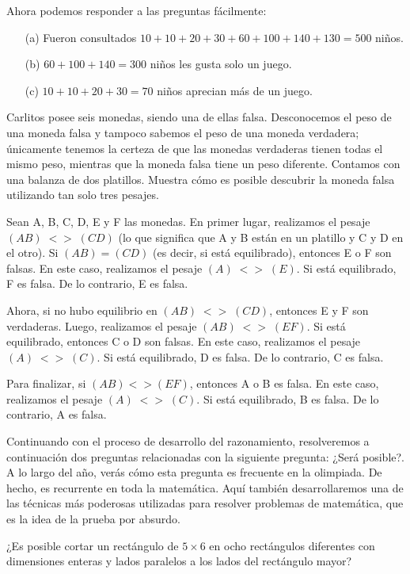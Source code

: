 \documentclass[11pt]{scrartcl}
\begin{document}
Ahora podemos responder a las preguntas fácilmente:
\begin{enumerate}
    \item[(a)] Fueron consultados \(10 + 10 + 20 + 30 + 60 + 100 + 140 + 130 = 500\) niños.
    \item[(b)] \(60 + 100 + 140 = 300\) niños les gusta solo un juego.
    \item[(c)] \(10 + 10 + 20 + 30 = 70\) niños aprecian más de un juego.
\end{enumerate}

\begin{example}
Carlitos posee seis monedas, siendo una de ellas falsa. Desconocemos el peso de una moneda falsa y tampoco sabemos el peso de una moneda verdadera; únicamente tenemos la certeza de que las monedas verdaderas tienen todas el mismo peso, mientras que la moneda falsa tiene un peso diferente. Contamos con una balanza de dos platillos. Muestra cómo es posible descubrir la moneda falsa utilizando tan solo tres pesajes.
\end{example}

Sean A, B, C, D, E y F las monedas. En primer lugar, realizamos el pesaje
\( (AB) \; <> \; (CD) \) (lo que significa que A y B están en un platillo y C y D en el otro). Si \( (AB) = (CD) \) (es decir, si está equilibrado), entonces E o F son falsas. En este caso, realizamos el pesaje \( (A) \; <> \; (E) \). Si está equilibrado, F es falsa. De lo contrario, E es falsa.

Ahora, si no hubo equilibrio en \( (AB) \; <> \; (CD) \), entonces E y F son verdaderas. Luego, realizamos el pesaje \( (AB) \; <> \; (EF) \). Si está equilibrado, entonces C o D son falsas. En este caso, realizamos el pesaje \( (A) \; <> \; (C) \). Si está equilibrado, D es falsa. De lo contrario, C es falsa.

Para finalizar, si \( (AB) <> (EF) \), entonces A o B es falsa. En este caso, realizamos el pesaje \( (A) \; <> \; (C) \). Si está equilibrado, B es falsa. De lo contrario, A es falsa.

Continuando con el proceso de desarrollo del razonamiento, resolveremos a continuación dos preguntas relacionadas con la siguiente pregunta: ¿Será posible?. A lo largo del año, verás cómo esta pregunta es frecuente en la olimpiada. De hecho, es recurrente en toda la matemática. Aquí también desarrollaremos una de las técnicas más poderosas utilizadas para resolver problemas de matemática, que es la idea de la prueba por absurdo.

\begin{example}
¿Es posible cortar un rectángulo de \(5 \times 6\) en ocho rectángulos diferentes con dimensiones enteras y lados paralelos a los lados del rectángulo mayor?\end{example}
\end{document}
